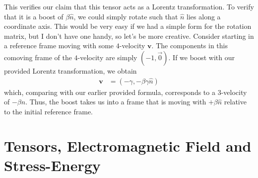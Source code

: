 \documentclass[12pt]{report}
\begin{document}
\begin{description}
        This verifies our claim that this tensor acts as a Lorentz
        transformation. To verify that it is a boost of $\beta\hat{n}$, we could
        simply rotate such that $\hat{n}$ lies along a coordinate axis. This
        would be very easy if we had a simple form for the rotation matrix, but
        I don't have one handy, so let's be more creative. Consider starting in
        a reference frame moving with some $4$-velocity $\mathbf{v}$. The
        components in this comoving frame of the $4$-velocity are simply $(-1,
        \vec{0})$. If we boost with our provided Lorentz transformation, we
        obtain
        \begin{align}
            \mathbf{v} &= \left( -\gamma, -\beta\gamma \hat{n} \right)
        \end{align}
        which, comparing with our earlier provided formula, corresponds to a
        $3$-velocity of $-\beta \hat{n}$. Thus, the boost takes us into a frame
        that is moving with $+\beta \hat{n}$ relative to the initial reference
        frame.
\end{description}

\section{Tensors, Electromagnetic Field and Stress-Energy}
\end{document}
